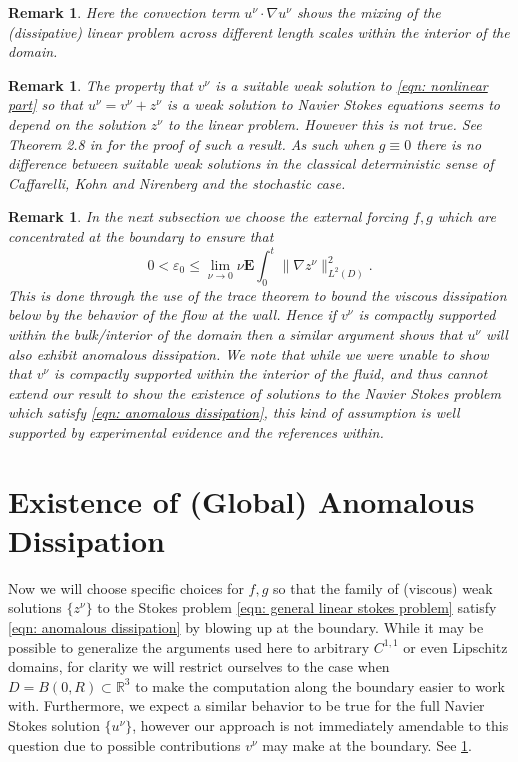 \documentclass[11pt, reqno]{article}
\def\R{{\mathbb R}} %
\newtheorem{remark}[theorem]{Remark}
\def\grad{\nabla}
\def\E{\mathbf{E}}
\begin{document}
\begin{remark}
    Here the convection term $u^\nu \cdot \grad u^\nu$ shows the mixing of the (dissipative) linear problem across different length scales within the interior of the domain. 
\end{remark}
\begin{remark}
    The property that $v^\nu$ is a suitable weak solution to \eqref{eqn: nonlinear part} so that $u^\nu = v^\nu + z^\nu$ is a weak solution to Navier Stokes equations seems to depend on the solution $z^\nu$ to the linear problem. However this is not true. See Theorem 2.8 in \cite{romito2010existence} for the proof of such a result. As such when $g \equiv 0$ there is no difference between suitable weak solutions in the classical deterministic sense of Caffarelli, Kohn and Nirenberg \cite{caffarelli1982partial} and the stochastic case.
\end{remark}
\begin{remark}\label{remark: navier stokes anomalous dissipation}
    In the next subsection we choose the external forcing $f,g$ which are concentrated at the boundary to ensure that 
    \[
        0 < \varepsilon_0 \leq \lim_{\nu \to 0}\nu\E\int_0^t\|\grad z^\nu\|_{L^2(D)}^2.
    \]
    This is done through the use of the trace theorem to bound the viscous dissipation below by the behavior of the flow at the wall. Hence if $v^\nu$ is compactly supported within the bulk/interior of the domain then a similar argument shows that $u^\nu$ will also exhibit anomalous dissipation. We note that while we were unable to show that $v^\nu$ is compactly supported within the interior of the fluid, and thus cannot extend our result to show the existence of solutions to the Navier Stokes problem which satisfy \eqref{eqn: anomalous dissipation}, this kind of assumption is well supported by experimental evidence \cite{pirozzoli2010dynamical} and the references within.
\end{remark}

\section{Existence of (Global) Anomalous Dissipation}\label{sec: exist anomalous dissipation}
Now we will choose specific choices for $f,g$ so that the family of (viscous) weak solutions $\{z^\nu\}$ to the Stokes problem \eqref{eqn: general linear stokes problem} satisfy \eqref{eqn: anomalous dissipation} by blowing up at the boundary. While it may be possible to generalize the arguments used here to arbitrary $C^{1,1}$ or even Lipschitz domains, for clarity we will restrict ourselves to the case when $D = B(0, R) \subset \R^3$ to make the computation along the boundary easier to work with. 
Furthermore, we expect a similar behavior to be true for the full Navier Stokes solution $\{u^\nu\}$, however our approach is not immediately amendable to this question due to possible contributions $v^\nu$ may make at the boundary. See \ref{remark: navier stokes anomalous dissipation}. 
\end{document}
